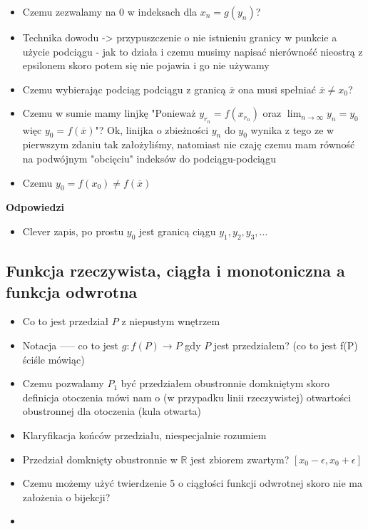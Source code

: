 \documentclass{article}
\begin{document}
\begin{itemize}
    \item Czemu zezwalamy na \(0\) w indeksach dla \(x_n = g(y_n)\)?
    \item Technika dowodu -> przypuszczenie o nie istnieniu granicy w punkcie a użycie podciągu - jak to działa i czemu musimy napisać nierówność nieostrą z epsilonem
    skoro potem się nie pojawia i go nie używamy
    \item Czemu wybierając podciąg podciągu z granicą \(\overline{x}\) ona musi spełniać \(\overline{x} \neq x_0\)?
    \item Czemu w sumie mamy linjkę "Ponieważ \(y_{r_n} = f(x_{r_n})\) oraz \(\lim_{n \to \infty} y_n = y_0\) więc \(y_0 = f(\overline{x})\)"?
    Ok, linijka o zbieżności \(y_n\) do \(y_0\) wynika z tego ze w pierwszym zdaniu tak założyliśmy,
    natomiast nie czaję czemu mam równość na podwójnym "obcięciu" indeksów do podciągu-podciągu
    \item Czemu \(y_0 = f(x_0) \neq f(\overline{x})\)
\end{itemize}
\begin{center}
    \textbf{Odpowiedzi}
\end{center}
\begin{itemize}
    \item Clever zapis, po prostu \(y_0\) jest granicą ciągu \(y_1, y_2, y_3, \dots\)
\end{itemize}

\subsection{Funkcja rzeczywista, ciągła i monotoniczna a funkcja odwrotna}

\begin{itemize}
    \item Co to jest przedział \(P\) z niepustym wnętrzem
    \item Notacja ----- co to jest \(g: f(P) \to P\) gdy \(P\) jest przedziałem? (co to jest f(P) ściśle mówiąc)
    \item Czemu pozwalamy \(P_1\) być przedziałem obustronnie domkniętym skoro definicja otoczenia mówi nam
    o (w przypadku linii rzeczywistej) otwartości obustronnej dla otoczenia (kula otwarta)
    \item Klaryfikacja końców przedziału, niespecjalnie rozumiem
    \item Przedział domknięty obustronnie w \(\mathbb{R}\) jest zbiorem zwartym? \([x_0 - \epsilon, x_0 + \epsilon]\)
    \item Czemu możemy użyć twierdzenie 5 o ciągłości funkcji odwrotnej skoro nie ma założenia o bijekcji?
    \item 
\end{itemize}
\end{document}
